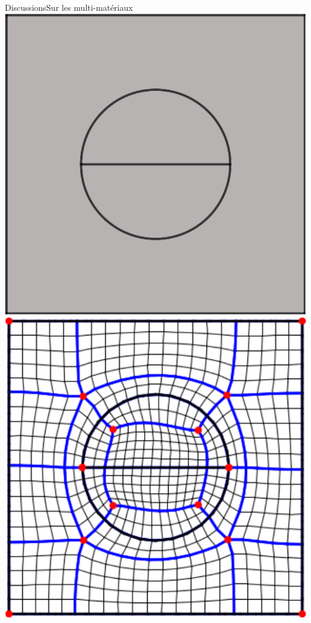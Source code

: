 \documentclass[compress,10pt,aspectratio=169]{beamer}
\begin{document}
\begin{frame}{Discussions}{Sur les multi-matériaux}
\centering
\includegraphics[scale=0.38]{images/carreDiscPleinCouper domain.pdf}\hspace{0.5cm}
\includegraphics[scale=0.57]{images/mesh_quad_6.pdf}
\end{frame}
\end{document}
